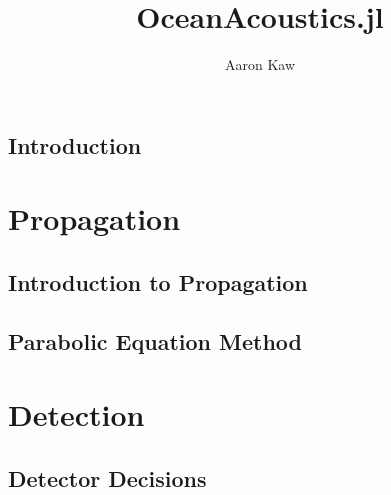 \documentclass{book}
\title{OceanAcoustics.jl}
\author{Aaron Kaw}
\begin{document}
\maketitle
\tableofcontents

\chapter{Introduction}

\part{Propagation}
\chapter{Introduction to Propagation}

\chapter{Parabolic Equation Method}

\part{Detection}

\chapter{Detector Decisions}
\end{document}
